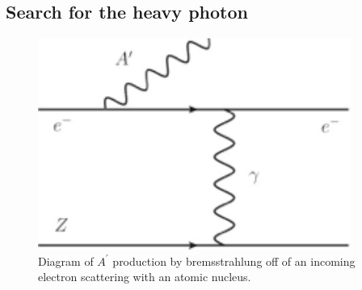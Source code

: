 \subsection{Search for the heavy photon}
\def \ap {A^\prime}
\def \map {m_{A^\prime}}
\def \thap {\theta_{A^\prime}}
\label{sec:apsignal}




\begin{figure}
\includegraphics[scale=1]{measurements/Aprime-diagram.pdf}
\caption{Diagram of  $\ap$ production by bremsstrahlung off of an incoming electron scattering with an atomic nucleus.}
\label{fig:apdiagram}
\end{figure}

